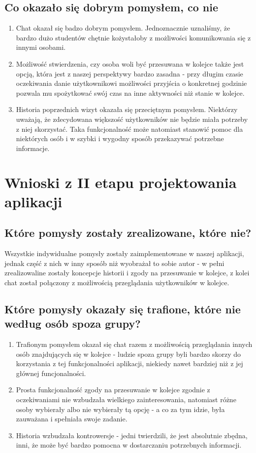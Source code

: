 \documentclass[12pt]{article}
\begin{document}
\subsection{Co okazało się dobrym pomysłem, co nie}
\begin {enumerate}
	\item Chat okazał się badzo dobrym pomysłem. Jednoznacznie uznaliśmy, że bardzo dużo studentów chętnie kożystałoby z możliwości komunikowania się z innymi osobami.
	
	\item Możliwość stwierdzenia, czy osoba woli być przesuwana w kolejce także jest opcją, która jest z naszej perspektywy bardzo zasadna - przy długim czasie oczekiwania danie użytkownikowi możliwości przyjścia o konkretnej godzinie pozwala mu spożytkować swój czas na inne aktywności niż stanie w kolejce.
	
	\item Historia poprzednich wizyt okazała się przeciętnym pomysłem. Niektórzy uważają, że zdecydowana większość użytkowników nie będzie miała potrzeby z niej skorzystać. Taka funkcjonalność może natomiast stanowić pomoc dla niektórych osób i w szybki i wygodny sposób przekazywać potrzebne informacje.
	
\end {enumerate}

\section {Wnioski z II etapu projektowania aplikacji}
\subsection {Które pomysły zostały zrealizowane, które nie?}

Wszystkie indywidualne pomysły zostały zaimplementowane w naszej aplikacji, jednak część z nich w inny sposób niż wyobrażał to sobie autor - w pełni zrealizowaline zostały koncepcje historii i zgody na przesuwanie w kolejce, z kolei chat został połączony z możliwością przeglądania użytkowników w kolejce.

\subsection{Które pomysły okazały się trafione, które nie według osób spoza grupy?}
\begin{enumerate}
	\item Trafionym pomysłem okazał się chat razem z możliwością przeglądania innych osób znajdujących się w kolejce - ludzie spoza grupy byli bardzo skorzy do korzystania z tej funkcjonalności aplikacji, niekiedy nawet bardziej niż z jej głównej funcjonalności.
	\item Prosta funkcjonalność zgody na przesuwanie w kolejce zgodnie z oczekiwaniami nie wzbudzała wielkiego zainteresowania, natomiast różne osoby wybierały albo nie wybierały tą opcję - a co za tym idzie, była zauważana i spełniała swoje zadanie.
	\item Historia wzbudzała kontrowersje - jedni twierdzili, że jest absolutnie zbędna, inni, że może być bardzo pomocna w dostarczaniu potrzebnych informacji.
\end{enumerate}
\end{document}
